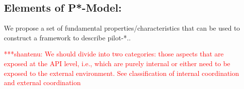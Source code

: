 \documentclass[conference,final]{IEEEtran}
\newcommand{\jhanote}[1]{ {\textcolor{red} { ***shantenu: #1 }}}
\newcommand{\jhanote}[1]{}
\begin{document}
% 
% 


\subsection{Elements of P*-Model:}

We propose a set of fundamental properties/characteristics that can be
used to construct a framework to describe pilot-*..

\jhanote{We should divide into two categories: those aspects that are
  exposed at the API level, i.e., which are purely internal or either
  need to be exposed to the external environment. See classification
  of internal coordination and external coordination}
\end{document}
